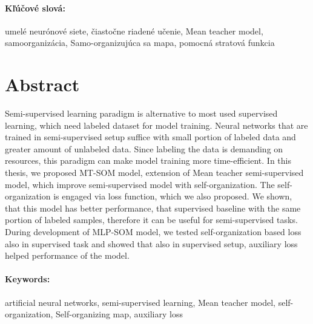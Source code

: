 \documentclass[12pt, twoside]{book}
\begin{document}
\paragraph*{Kľúčové slová:} umelé neurónové siete, čiastočne riadené učenie, Mean teacher model, samoorganizácia, Samo-organizujúca sa mapa, pomocná stratová funkcia




\newpage 
\section*{Abstract}

Semi-supervised learning paradigm is alternative to most used supervised learning, which need labeled dataset for model training. Neural networks that are trained in semi-supervised setup suffice with small portion of labeled data and greater amount of unlabeled data. Since labeling the data is demanding on resources, this paradigm can make model training more time-efficient.
In this thesis, we proposed MT-SOM model, extension of Mean teacher semi-supervised model, which improve semi-supervised model with self-organization. The self-organization is engaged via loss function, which we also proposed. We shown, that this model has better performance, that supervised baseline with the same portion of labeled samples, therefore it can be useful for semi-supervised tasks. During development of MLP-SOM model, we tested self-organization based loss also in supervised task and showed that also in supervised setup, auxiliary loss helped performance of the model.


\paragraph*{Keywords:} artificial neural networks, semi-supervised learning, Mean teacher model, self-organization, Self-organizing map, auxiliary loss



%
%
%
%
\end{document}
